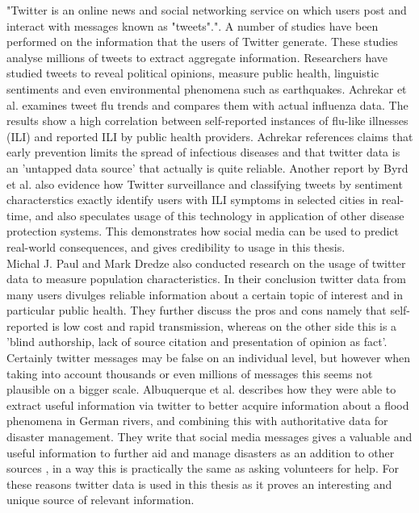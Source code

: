 "Twitter is an online news and social networking service on which users post and interact with messages known as "tweets"."\cite{twitter_twitter}. A number of studies have been performed on the information that the users of Twitter generate. These studies analyse millions of tweets to extract aggregate information. Researchers have studied tweets to reveal political opinions\cite{twitter_politic}, measure public health\cite{twitter_flu_trends}, linguistic sentiments\cite{twitter_linguistics} and even environmental phenomena such as earthquakes\cite{twitter_earthQuake}. Achrekar et al.\cite{twitter_flu_trends} examines tweet flu trends and compares them with actual influenza data. The results show a high correlation between self-reported instances of flu-like illnesses (ILI) and reported ILI by public health providers. Achrekar references claims that early prevention limits the spread of infectious diseases and that twitter data is an 'untapped data source' that actually is quite reliable. Another report by Byrd et al.\cite{byrd2016mining} also evidence how Twitter surveillance and classifying tweets by sentiment characterstics exactly identify users with ILI symptoms in selected cities in real-time, and also speculates usage of this technology in application of other disease protection systems. This demonstrates how social media can be  used to predict real-world consequences, and gives credibility to usage in this thesis. \\Michal J. Paul and Mark Dredze \cite{twitter_what_you_tweet} also conducted research on the usage of twitter data to measure population characteristics. In their conclusion twitter data from many users divulges reliable information about a certain topic of interest and in particular public health. They further discuss the pros and cons namely that self-reported is low cost and rapid transmission, whereas on the other side this is a 'blind authorship, lack of source citation and presentation of opinion as fact'. Certainly twitter messages may be false on an individual level, but however when taking into account thousands or even millions of messages this seems not plausible on a bigger scale. Albuquerque et al. \cite{de2015geographic} describes how they were able to extract useful information via twitter to better acquire information about a flood phenomena in German rivers, and combining this with authoritative data for disaster management. They write that social media messages gives a valuable and useful information to further aid and manage disasters as an addition to other sources , in a way this is practically the same as asking volunteers for help. For these reasons twitter data is used in this thesis as it proves an interesting and unique source of relevant information.





